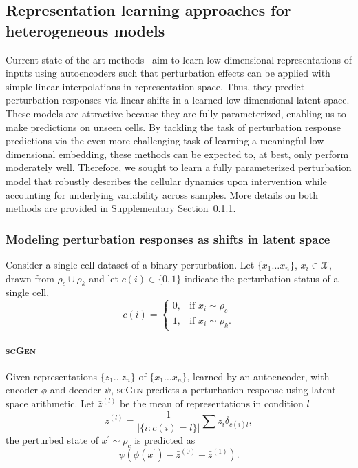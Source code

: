 \subsection{Representation learning approaches for heterogeneous models}  %
Current state-of-the-art methods~\citep{suppLopez2018scvi, supplotfollahi2019scgen, yang2020predicting} aim to learn low-dimensional representations of inputs using autoencoders such that perturbation effects can be applied with simple linear interpolations in representation space. Thus, they predict perturbation responses via linear shifts in a learned low-dimensional latent space. These models are attractive because they are fully parameterized, enabling us to make predictions on unseen cells. By tackling the task of perturbation response predictions via the even more challenging task of learning a meaningful low-dimensional embedding, these methods can be expected to, at best, only perform moderately well. Therefore, we sought to learn a fully parameterized perturbation model that robustly describes the cellular dynamics upon intervention while accounting for underlying variability across samples. More details on both methods are provided in Supplementary Section~\ref{supp:ae_methods}.

\subsubsection{Modeling perturbation responses as shifts in latent space} \label{supp:ae_methods}
Consider a single-cell dataset of a binary perturbation.
Let $\{x_1 \ldots x_n\}$, $x_i \in \mathcal{X}$, drawn from $\rho_c \cup \rho_k$
and let $c(i) \in \{0, 1\}$ indicate the perturbation status of a single cell,
\[
    c(i) = 
\begin{cases}
    0, & \text{if } x_i \sim \rho_c\\
    1, & \text{if } x_i \sim \rho_k.
\end{cases}
\]

\paragraph{\textsc{scGen}}
Given representations $\{z_1 \ldots z_n \}$ of $\{x_1 \ldots x_n\}$, learned by an autoencoder, with encoder $\phi$ and decoder $\psi$,
\textsc{scGen} \citep{supplotfollahi2019scgen} predicts a perturbation response using latent space arithmetic.
Let $\bar{z}^{(l)}$ be the mean of representations in condition $l$
\begin{equation*}
    \bar{z}^{(l)} = \frac{1}{|\{i: c(i) = l\}|} \sum{z_i \delta_{c(i)l}},
\end{equation*}
the perturbed state of $x^\prime \sim \rho_c$ is predicted as
\begin{equation*}
    \psi(\phi(x^\prime) - \bar{z}^{(0)} + \bar{z}^{(1)}).
\end{equation*}


